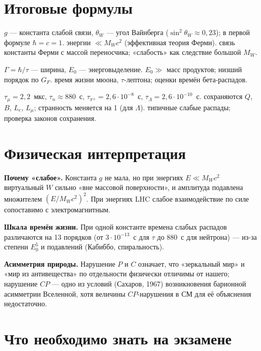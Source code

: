 \section{Итоговые формулы}

 {$g$ — константа слабой связи, $\theta_W$ — угол Вайнберга ($\sin^2\theta_W\approx0{,}23$); в первой формуле $\hbar=c=1$.}
 {энергии $\ll M_Wc^2$ (эффективная теория Ферми).}
 {связь константы Ферми с массой переносчика; «слабость» как следствие большой $M_W$.}

 {$\Gamma=\hbar/\tau$ — ширина, $E_0$ — энерговыделение.}
 {$E_0\gg$ масс продуктов; низший порядок по $G_F$.}
 {время жизни мюона, $\tau$-лептона; оценки времён бета-распадов.}

 {$\tau_\mu=2{,}2$~мкс, $\tau_n\approx880$~с, $\tau_{\pi^\pm}=2{,}6\cdot10^{-8}$~с, $\tau_\Lambda=2{,}6\cdot10^{-10}$~с.}
 {сохраняются $Q$, $B$, $L_e$, $L_\mu$; странность меняется на 1 (для $\Lambda$).}
 {типичные слабые распады; проверка законов сохранения.}

\section{Физическая интерпретация}

\textbf{Почему «слабое».} Константа $g$ не мала, но при энергиях $E\ll M_Wc^2$ виртуальный $W$ сильно «вне массовой
поверхности», и амплитуда подавлена множителем $(E/M_Wc^2)^2$. При энергиях LHC слабое взаимодействие по силе
сопоставимо с электромагнитным.

\textbf{Шкала времён жизни.} При одной константе времена слабых распадов различаются на 13 порядков (от
$3\cdot10^{-13}$~с для $\tau$ до 880~с для нейтрона) — из-за степени $E_0^5$ и подавлений (Кабиббо, спиральность).

\textbf{Асимметрия природы.} Нарушение $P$ и $C$ означает, что «зеркальный мир» и «мир из антивещества» по отдельности
физически отличимы от нашего; нарушение $CP$ — одно из условий (Сахаров, 1967) возникновения барионной асимметрии
Вселенной, хотя величины $CP$-нарушения в СМ для её объяснения недостаточно.

\section{Что необходимо знать на экзамене}

